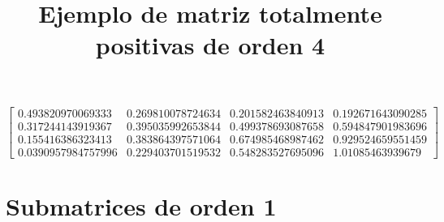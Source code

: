\documentclass[12pt]{article}
\begin{document}
\title{Ejemplo de matriz totalmente positivas de orden 4}
\maketitle

$$\left[\begin{matrix}0.493820970069333 & 0.269810078724634 & 0.201582463840913 & 0.192671643090285\\0.317244143919367 & 0.395035992653844 & 0.499378693087658 & 0.594847901983696\\0.155416386323413 & 0.383864397571064 & 0.674985468987462 & 0.929524659551459\\0.0390957984757996 & 0.229403701519532 & 0.548283527695096 & 1.01085463939679\end{matrix}\right]$$


\section*{Submatrices de orden 1}
\end{document}
